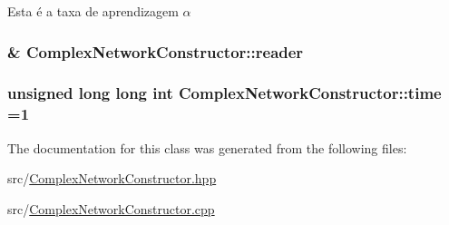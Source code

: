 Esta é a taxa de aprendizagem $ \alpha $ \hypertarget{class_complex_network_constructor_ad223ad7e464ff159d91a89deb4e943cc}{
\subsubsection[{reader}]{\& Complex\+Network\+Constructor\+::reader\hspace{0.3cm}{\ttfamily [private]}}}\label{class_complex_network_constructor_ad223ad7e464ff159d91a89deb4e943cc}
\hypertarget{class_complex_network_constructor_afc016404ca7dda4b05807e3ca004c308}{
\subsubsection[{time}]{\setlength{\rightskip}{0pt plus 5cm}unsigned long long int Complex\+Network\+Constructor\+::time =1\hspace{0.3cm}{\ttfamily [private]}}}\label{class_complex_network_constructor_afc016404ca7dda4b05807e3ca004c308}


The documentation for this class was generated from the following files\+:\begin{DoxyCompactItemize}
\item 
src/\hyperlink{_complex_network_constructor_8hpp}{Complex\+Network\+Constructor.\+hpp}\item 
src/\hyperlink{_complex_network_constructor_8cpp}{Complex\+Network\+Constructor.\+cpp}\end{DoxyCompactItemize}
